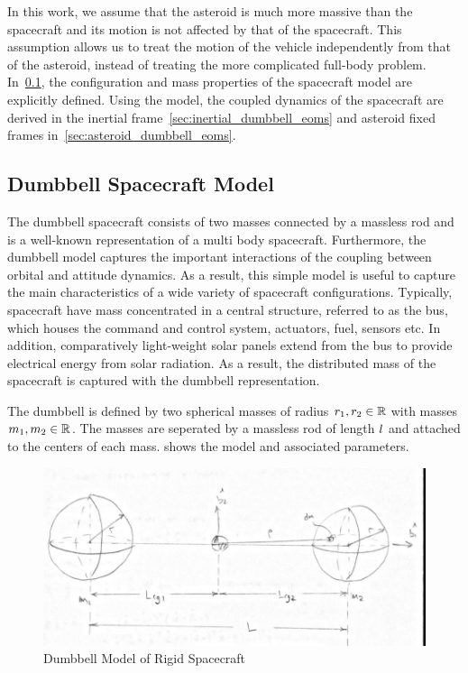 

In this work, we assume that the asteroid is much more massive than the spacecraft and its motion is not affected by that of the spacecraft.
This assumption allows us to treat the motion of the vehicle independently from that of the asteroid, instead of treating the more complicated full-body problem. 
In~\cref{sec:dumbbell_model}, the configuration and mass properties of the spacecraft model are explicitly defined.
Using the model, the coupled dynamics of the spacecraft are derived in the inertial frame~\cref{sec:inertial_dumbbell_eoms} and asteroid fixed frames in~\cref{sec:asteroid_dumbbell_eoms}.

\subsection{Dumbbell Spacecraft Model}\label{sec:dumbbell_model}

The dumbbell spacecraft consists of two masses connected by a massless rod and is a well-known representation of a multi body spacecraft.
Furthermore, the dumbbell model captures the important interactions of the coupling between orbital and attitude dynamics. 
As a result, this simple model is useful to capture the main characteristics of a wide variety of spacecraft configurations.
Typically, spacecraft have mass concentrated in a central structure, referred to as the bus, which houses the command and control system, actuators, fuel, sensors etc. 
In addition, comparatively light-weight solar panels extend from the bus to provide electrical energy from solar radiation. 
As a result, the distributed mass of the spacecraft is captured with the dumbbell representation.

The dumbbell is defined by two spherical masses of radius \( r_{1}, r_{2} \in \mathbb{R} \) with masses \( m_{1}, m_{2} \in  \mathbb{R}\).
The masses are seperated by a massless rod of length \( l_{} \) and attached to the centers of each mass.
 shows the model and associated parameters.
\begin{figure}[htbp]
    \centering
    \includegraphics[width=\textwidth]{figures/dumbbell.png}
    \caption{Dumbbell Model of Rigid Spacecraft}
    \label{fig:dumbbell_sc}
\end{figure}

